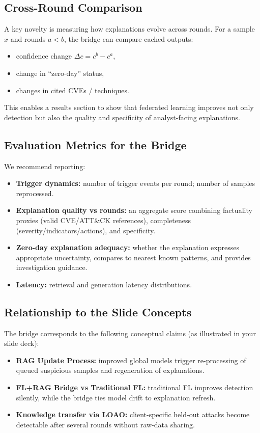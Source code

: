 \subsection{Cross-Round Comparison}
\label{sec:cross-round}

A key novelty is measuring how explanations evolve across rounds. For a sample $x$ and rounds $a<b$, the bridge can compare cached outputs:
\begin{itemize}
  \item confidence change $\Delta c = c^{b}-c^{a}$,
  \item change in ``zero-day'' status,
  \item changes in cited CVEs / techniques.
\end{itemize}
This enables a results section to show that federated learning improves not only detection but also the quality and specificity of analyst-facing explanations.

\subsection{Evaluation Metrics for the Bridge}
\label{sec:bridge-metrics}

We recommend reporting:
\begin{itemize}
  \item \textbf{Trigger dynamics:} number of trigger events per round; number of samples reprocessed.
  \item \textbf{Explanation quality vs rounds:} an aggregate score combining factuality proxies (valid CVE/ATT\&CK references), completeness (severity/indicators/actions), and specificity.
  \item \textbf{Zero-day explanation adequacy:} whether the explanation expresses appropriate uncertainty, compares to nearest known patterns, and provides investigation guidance.
  \item \textbf{Latency:} retrieval and generation latency distributions.
\end{itemize}

\subsection{Relationship to the Slide Concepts}
\label{sec:slide-mapping}

The bridge corresponds to the following conceptual claims (as illustrated in your slide deck):
\begin{itemize}
  \item \textbf{RAG Update Process:} improved global models trigger re-processing of queued suspicious samples and regeneration of explanations.
  \item \textbf{FL+RAG Bridge vs Traditional FL:} traditional FL improves detection silently, while the bridge ties model drift to explanation refresh.
  \item \textbf{Knowledge transfer via LOAO:} client-specific held-out attacks become detectable after several rounds without raw-data sharing.
\end{itemize}

